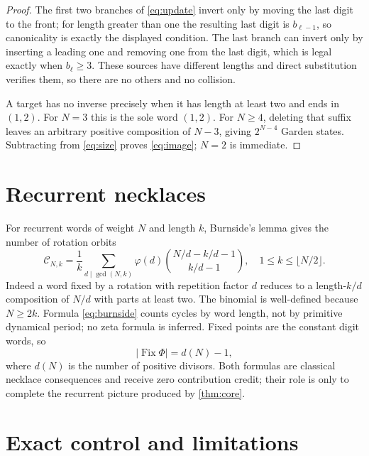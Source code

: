 \documentclass[10pt,a4paper]{amsart}
\theoremstyle{definition}
\theoremstyle{remark}
\newcommand{\Fix}{\operatorname{Fix}}
\begin{document}
\begin{proof}
The first two branches of \eqref{eq:update} invert only by moving the last
digit to the front; for length greater than one the resulting last digit is
$b_{\ell-1}$, so canonicality is exactly the displayed condition.  The last
branch can invert only by inserting a leading one and removing one from the
last digit, which is legal exactly when $b_\ell\ge3$.  These sources have
different lengths and direct substitution verifies them, so there are no
others and no collision.

A target has no inverse precisely when it has length at least two and ends
in $(1,2)$.  For $N=3$ this is the sole word $(1,2)$.  For $N\ge4$, deleting
that suffix leaves an arbitrary positive composition of $N-3$, giving
$2^{N-4}$ Garden states.  Subtracting from \eqref{eq:size} proves
\eqref{eq:image}; $N=2$ is immediate.
\end{proof}

\section{Recurrent necklaces}

For recurrent words of weight $N$ and length $k$, Burnside's lemma gives the
number of rotation orbits
\begin{equation}
 \mathcal C_{N,k}=\frac1k\sum_{d\mid\gcd(N,k)}\varphi(d)
 \binom{N/d-k/d-1}{k/d-1},
 \quad1\le k\le\lfloor N/2\rfloor.                    \label{eq:burnside}
\end{equation}
Indeed a word fixed by a rotation with repetition factor $d$ reduces to a
length-$k/d$ composition of $N/d$ with parts at least two.  The binomial is
well-defined because $N\ge2k$.  Formula \eqref{eq:burnside} counts cycles by
word length, not by primitive dynamical period; no zeta formula is inferred.
Fixed points are the constant digit words, so
\begin{equation}
                         |\Fix\Phi|=d(N)-1,             \label{eq:fixed}
\end{equation}
where $d(N)$ is the number of positive divisors.  Both formulas are classical
necklace consequences and receive zero contribution credit; their role is
only to complete the recurrent picture produced by \cref{thm:core}.

\section{Exact control and limitations}
\end{document}
